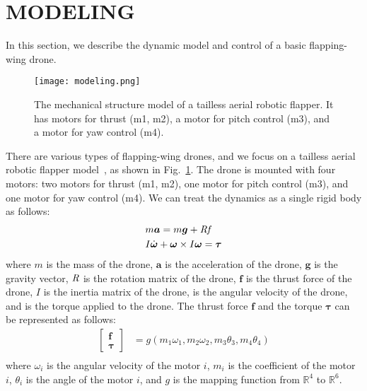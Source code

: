 \section{MODELING}
\label{sec:modeling}
In this section, we describe the dynamic model and control of a basic flapping-wing drone.
\begin{figure}[b]
    \centering
    \texttt{[image: modeling.png]}
    \caption{The mechanical structure model of a tailless aerial robotic flapper. It has motors for thrust (m1, m2), a motor for pitch control (m3), and a motor for yaw control (m4).}
    \label{figure:modeling}
  \end{figure}
There are various types of flapping-wing drones, and we focus on a tailless aerial robotic flapper model~\cite{karasek2018tailless}, as shown in Fig.~\ref{figure:modeling}.
The drone is mounted with four motors: two motors for thrust (m1, m2), one motor for pitch control (m3), and one motor for yaw control (m4).
We can treat the dynamics as a single rigid body as follows:
\begin{equation}
    \begin{aligned}
      &m\bm{a} = m\bm{g} + \it{R}\bm{f}\\
      &I\dot{\bm{\omega}} + \bm{\omega} \times I\bm{\omega} = \bm{\tau}
    \end{aligned}
\end{equation}
where $m$ is the mass of the drone, 
$\bm{a}$ is the acceleration of the drone,
$\bm{g}$ is the gravity vector,
$\it{R}$ is the rotation matrix of the drone,
$\bm{f}$ is the thrust force of the drone,
$I$ is the inertia matrix of the drone, 
\bm{$\omega$} is the angular velocity of the drone, 
and \bm{$\tau$} is the torque applied to the drone.
The thrust force $\bm{f}$ and the torque $\bm{\tau}$ can be represented as follows:
\begin{equation}
  \label{eq:control}
  \begin{aligned}
    \begin{bmatrix}
      \bm{f}\\
      \bm{\tau}
    \end{bmatrix}
    &=
    g(m_1\omega_1, m_2\omega_2, m_3\theta_3, m_4\theta_4)\\
  \end{aligned}
\end{equation}
where $\omega_i$ is the angular velocity of the motor $i$, $m_i$ is the coefficient of the motor $i$, $\theta_i$ is the angle of the motor $i$, and $g$ is the mapping function from $\mathbb{R}^4$ to $\mathbb{R}^6$.

